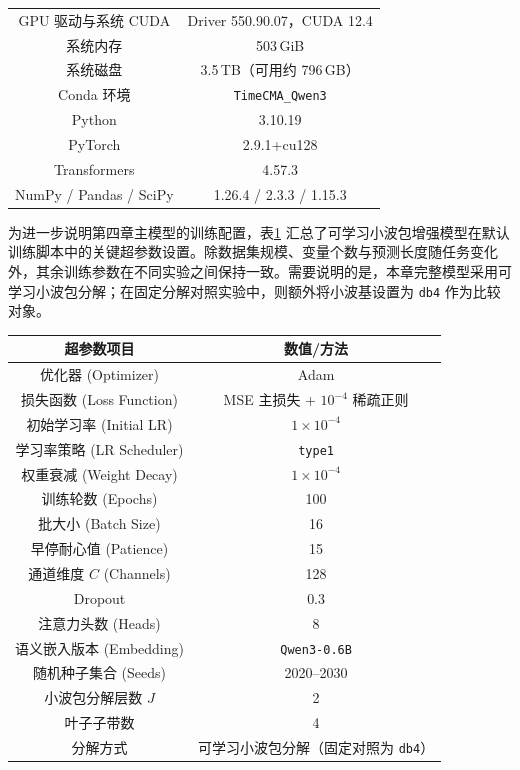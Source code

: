 \begin{table}[!htb]
\begin{tabular}{c|c}
GPU 驱动与系统 CUDA & Driver 550.90.07，CUDA 12.4 \\
系统内存 & 503\,GiB \\
系统磁盘 & 3.5\,TB（可用约 796\,GB） \\
Conda 环境 & \texttt{TimeCMA\_Qwen3} \\
Python & 3.10.19 \\
PyTorch & 2.9.1+cu128 \\
Transformers & 4.57.3 \\
NumPy / Pandas / SciPy & 1.26.4 / 2.3.3 / 1.15.3 \\
\bottomrule
\end{tabular}
\end{table} 为进一步说明第四章主模型的训练配置，表\ref{tab:chap4-hparams} 汇总了可学习小波包增强模型在默认训练脚本中的关键超参数设置。除数据集规模、变量个数与预测长度随任务变化外，其余训练参数在不同实验之间保持一致。需要说明的是，本章完整模型采用可学习小波包分解；在固定分解对照实验中，则额外将小波基设置为 \texttt{db4} 作为比较对象。 \begin{table}[!htb]
\centering
\small
\setlength{\tabcolsep}{4.2pt}
\renewcommand{\arraystretch}{1.02}
\label{tab:chap4-hparams}
\begin{tabular}{c|c}
\toprule
\textbf{超参数项目} & \textbf{数值/方法} \\
\midrule
优化器 (Optimizer) & Adam \\
损失函数 (Loss Function) & MSE 主损失 + $10^{-4}$ 稀疏正则 \\
初始学习率 (Initial LR) & $1 \times 10^{-4}$ \\
学习率策略 (LR Scheduler) & \texttt{type1} \\
权重衰减 (Weight Decay) & $1 \times 10^{-4}$ \\
训练轮数 (Epochs) & 100 \\
批大小 (Batch Size) & 16 \\
早停耐心值 (Patience) & 15 \\
通道维度 $C$ (Channels) & 128 \\
Dropout & 0.3 \\
注意力头数 (Heads) & 8 \\
语义嵌入版本 (Embedding) & \texttt{Qwen3-0.6B} \\
随机种子集合 (Seeds) & 2020--2030 \\
\midrule
小波包分解层数 $J$ & 2 \\
叶子子带数 & 4 \\
分解方式 & 可学习小波包分解（固定对照为 \texttt{db4}） \\

\end{tabular}
\end{table}
